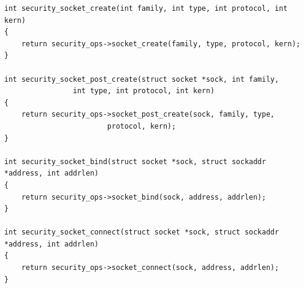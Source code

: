 \begin{lstlisting}[frame=none, numbers=none, caption=\texttt{register\_security} function (Linux kernel v3.11), label=lst:security_func_code]
int security_socket_create(int family, int type, int protocol, int kern)
{
	return security_ops->socket_create(family, type, protocol, kern);
}

int security_socket_post_create(struct socket *sock, int family,
				int type, int protocol, int kern)
{
	return security_ops->socket_post_create(sock, family, type,
						protocol, kern);
}

int security_socket_bind(struct socket *sock, struct sockaddr *address, int addrlen)
{
	return security_ops->socket_bind(sock, address, addrlen);
}

int security_socket_connect(struct socket *sock, struct sockaddr *address, int addrlen)
{
	return security_ops->socket_connect(sock, address, addrlen);
}
\end{lstlisting}
